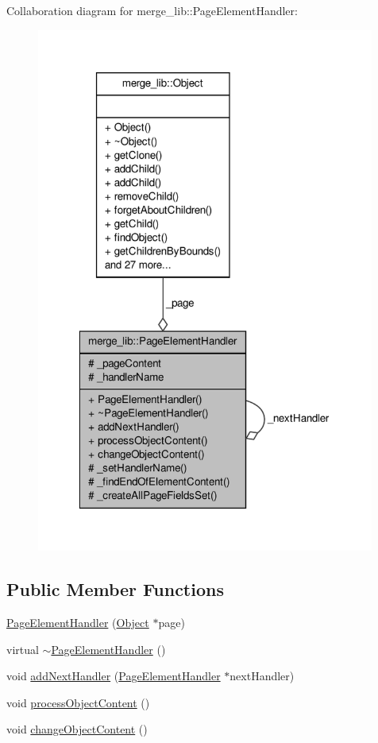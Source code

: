 Collaboration diagram for merge\-\_\-lib\-:\-:Page\-Element\-Handler\-:
\nopagebreak
\begin{figure}[H]
\begin{center}
\leavevmode
\includegraphics[width=315pt]{de/d2c/classmerge__lib_1_1_page_element_handler__coll__graph}
\end{center}
\end{figure}
\subsection*{Public Member Functions}
\begin{DoxyCompactItemize}
\item 
\hyperlink{classmerge__lib_1_1_page_element_handler_ada309a9bc3d0047d0038680cee9ac5be}{Page\-Element\-Handler} (\hyperlink{classmerge__lib_1_1_object}{Object} $\ast$page)
\item 
virtual \hyperlink{classmerge__lib_1_1_page_element_handler_abe2c1e2d98d7d383b4cd98f1873b1c58}{$\sim$\-Page\-Element\-Handler} ()
\item 
void \hyperlink{classmerge__lib_1_1_page_element_handler_a2f70456aa95c0e2a30c749b5eb7b15a0}{add\-Next\-Handler} (\hyperlink{classmerge__lib_1_1_page_element_handler}{Page\-Element\-Handler} $\ast$next\-Handler)
\item 
void \hyperlink{classmerge__lib_1_1_page_element_handler_a4344983a7b938dc8c29a8ddd319c8771}{process\-Object\-Content} ()
\item 
void \hyperlink{classmerge__lib_1_1_page_element_handler_a3c2f6868b3578e8ee1d5c9f0a37120d3}{change\-Object\-Content} ()
\end{DoxyCompactItemize}
